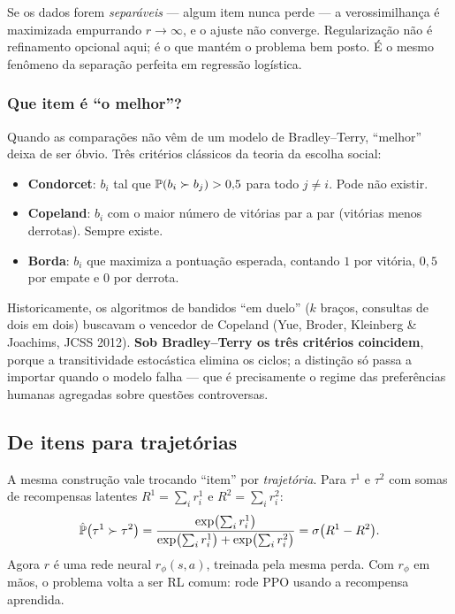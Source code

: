 \documentclass[11pt, a4paper]{article}
\newcommand{\rphi}{r_{\phi}}
\newcommand{\traj}{\tau}
\newcommand{\sig}{\sigma}
\begin{document}
\begin{alertabox}
Se os dados forem \emph{separáveis} --- algum item nunca perde --- a
verossimilhança é maximizada empurrando $r\to\infty$, e o ajuste não converge.
Regularização não é refinamento opcional aqui; é o que mantém o problema bem
posto. É o mesmo fenômeno da separação perfeita em regressão logística.
\end{alertabox}

\subsubsection*{Que item é ``o melhor''?}

Quando as comparações não vêm de um modelo de Bradley--Terry, ``melhor'' deixa de
ser óbvio. Três critérios clássicos da teoria da escolha social:

\begin{itemize}
  \item \textbf{Condorcet}: $b_i$ tal que $\mathbb{P}(b_i\succ b_j)>0{,}5$ para todo
    $j\ne i$. Pode não existir.
  \item \textbf{Copeland}: $b_i$ com o maior número de vitórias par a par
    (vitórias menos derrotas). Sempre existe.
  \item \textbf{Borda}: $b_i$ que maximiza a pontuação esperada, contando $1$ por
    vitória, $0{,}5$ por empate e $0$ por derrota.
\end{itemize}

Historicamente, os algoritmos de bandidos ``em duelo'' ($k$ braços, consultas de
dois em dois) buscavam o vencedor de Copeland (Yue, Broder, Kleinberg \&
Joachims, JCSS 2012). \textbf{Sob Bradley--Terry os três critérios coincidem},
porque a transitividade estocástica elimina os ciclos; a distinção só passa a
importar quando o modelo falha --- que é precisamente o regime das preferências
humanas agregadas sobre questões controversas.

\subsection{De itens para trajetórias}

A mesma construção vale trocando ``item'' por \emph{trajetória}. Para
$\traj^1$ e $\traj^2$ com somas de recompensas latentes
$R^1 = \sum_i r^1_i$ e $R^2 = \sum_i r^2_i$:
\[
  \hat\Prob\bigl(\traj^1 \succ \traj^2\bigr)
    = \frac{\exp\bigl(\sum_i r^1_i\bigr)}
           {\exp\bigl(\sum_i r^1_i\bigr)+\exp\bigl(\sum_i r^2_i\bigr)}
    = \sig\bigl(R^1 - R^2\bigr).
\]
Agora $r$ é uma rede neural $\rphi(s,a)$, treinada pela mesma perda. Com
$\rphi$ em mãos, o problema volta a ser RL comum: rode PPO usando a recompensa
aprendida.
\end{document}
